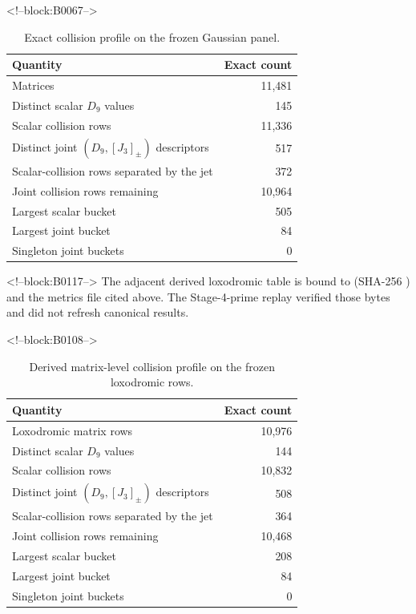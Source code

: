 \documentclass[11pt,a4paper]{article}
\theoremstyle{definition}
\theoremstyle{remark}
\begin{document}
<!--block:B0067-->
\begin{table}[t]
\centering
\caption{Exact collision profile on the frozen Gaussian panel.}
\label{tab:collision}
\begin{tabular}{lr}
\toprule
Quantity & Exact count \\
\midrule
Matrices & 11,481 \\
Distinct scalar \(D_9\) values & 145 \\
Scalar collision rows & 11,336 \\
Distinct joint \((D_9,[J_3]_{\pm})\) descriptors & 517 \\
Scalar-collision rows separated by the jet & 372 \\
Joint collision rows remaining & 10,964 \\
Largest scalar bucket & 505 \\
Largest joint bucket & 84 \\
Singleton joint buckets & 0 \\
\bottomrule
\end{tabular}
\end{table}

<!--block:B0117-->
The adjacent derived loxodromic table is bound to  (SHA-256 ) and the metrics file cited above. The Stage-4-prime replay verified those bytes and did not refresh canonical results.

<!--block:B0108-->
\begin{table}[t]
\centering
\caption{Derived matrix-level collision profile on the frozen loxodromic rows.}
\label{tab:collision-loxodromic}
\begin{tabular}{lr}
\toprule
Quantity & Exact count \\
\midrule
Loxodromic matrix rows & 10,976 \\
Distinct scalar \(D_9\) values & 144 \\
Scalar collision rows & 10,832 \\
Distinct joint \((D_9,[J_3]_{\pm})\) descriptors & 508 \\
Scalar-collision rows separated by the jet & 364 \\
Joint collision rows remaining & 10,468 \\
Largest scalar bucket & 208 \\
Largest joint bucket & 84 \\
Singleton joint buckets & 0 \\
\bottomrule
\end{tabular}
\end{table}
\end{document}
